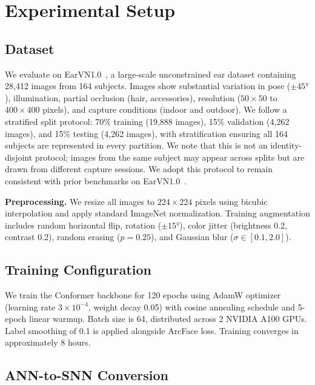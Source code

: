 \documentclass[11pt,a4paper]{article}
\begin{document}
\section{Experimental Setup}\label{sec:setup}

\subsection{Dataset}

We evaluate on EarVN1.0~\cite{hoang2019earvn}, a large-scale unconstrained ear dataset containing 28,412 images from 164 subjects. Images show substantial variation in pose ($\pm45°$), illumination, partial occlusion (hair, accessories), resolution ($50\times50$ to $400\times400$ pixels), and capture conditions (indoor and outdoor). We follow a stratified split protocol: 70\% training (19,888 images), 15\% validation (4,262 images), and 15\% testing (4,262 images), with stratification ensuring all 164 subjects are represented in every partition. We note that this is not an identity-disjoint protocol; images from the same subject may appear across splits but are drawn from different capture sessions. We adopt this protocol to remain consistent with prior benchmarks on EarVN1.0~\cite{alshazly2020deep, nguyen2022ear}.

\textbf{Preprocessing.} We resize all images to $224\times224$ pixels using bicubic interpolation and apply standard ImageNet normalization. Training augmentation includes random horizontal flip, rotation ($\pm15°$), color jitter (brightness 0.2, contrast 0.2), random erasing ($p=0.25$), and Gaussian blur ($\sigma \in [0.1, 2.0]$).

\subsection{Training Configuration}

We train the Conformer backbone for 120 epochs using AdamW optimizer (learning rate $3\times10^{-4}$, weight decay 0.05) with cosine annealing schedule and 5-epoch linear warmup. Batch size is 64, distributed across 2 NVIDIA A100 GPUs. Label smoothing of 0.1 is applied alongside ArcFace loss. Training converges in approximately 8 hours.

\subsection{ANN-to-SNN Conversion}
\end{document}
